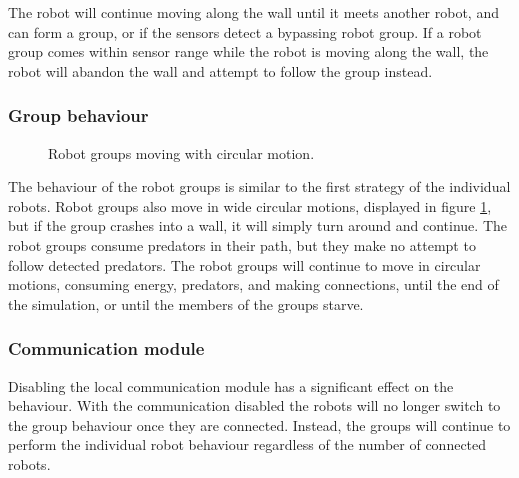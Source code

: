 The robot will continue moving along the wall until it meets another robot, and can form a group, or if the sensors detect a bypassing robot group.
If a robot group comes within sensor range while the robot is moving along the wall, the robot will abandon the wall and attempt to follow the group instead.

\subsubsection{Group behaviour}


\begin{figure}[H]
	
	\centering
	\caption{Robot groups moving with circular motion.}
	\label{fig:group-circles}
\end{figure}

The behaviour of the robot groups is similar to the first strategy of the individual robots.
Robot groups also move in wide circular motions, displayed in figure \ref{fig:group-circles}, but if the group crashes into a wall, it will simply turn around and continue.
The robot groups consume predators in their path, but they make no attempt to follow detected predators.
The robot groups will continue to move in circular motions, consuming energy, predators, and making connections, until the end of the simulation, or until the members of the groups starve.

\subsubsection{Communication module}
\label{sec:disable-local-communication}
Disabling the local communication module has a significant effect on the behaviour.
With the communication disabled the robots will no longer switch to the group behaviour once they are connected.
Instead, the groups will continue to perform the individual robot behaviour regardless of the number of connected robots.

